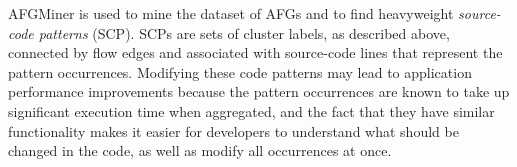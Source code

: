 AFGMiner is used to mine the dataset of AFGs and to find heavyweight \emph{source-code patterns} (SCP). SCPs are sets of cluster labels, as described above, connected by flow edges and associated with source-code lines that represent the pattern occurrences. Modifying these code patterns may lead to application performance improvements because the pattern occurrences are known to take up significant execution time when aggregated, and the fact that they have similar functionality makes it easier for developers to understand what should be changed in the code, as well as modify all occurrences at once. 




